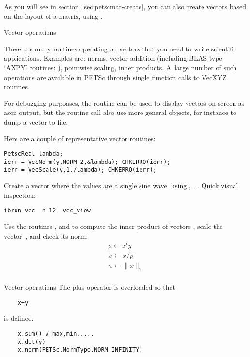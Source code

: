 As you will see in section~\ref{sec:petscmat-create},
you can also create vectors based on the layout of a matrix,
using .

 {Vector operations}

There are many routines operating on vectors that you need
to write scientific applications. Examples are: norms, vector addition
(including \ac{BLAS}-type `AXPY' routines: ),
pointwise scaling, inner products.
A~large number of such operations are available in PETSc through
single function calls to {VecXYZ} routines.

For debugging purpoases,
the  routine can be used to display vectors on screen as
ascii output,
%
%
but the routine call also use more general  objects, for
instance to dump a vector to file.

Here are a couple of representative vector routines:
\begin{lstlisting}
PetscReal lambda;
ierr = VecNorm(y,NORM_2,&lambda); CHKERRQ(ierr);
ierr = VecScale(y,1./lambda); CHKERRQ(ierr);  
\end{lstlisting}

\begin{exercise}
  Create a vector where the values are a single sine wave.
  using , ,
  .
  Quick visual inspection:
\begin{verbatim}
ibrun vec -n 12 -vec_view
\end{verbatim}
\end{exercise}

\begin{exercise}
Use the routines , 
and  to compute the inner product of vectors
, scale the vector~, and check its norm:
\[
\begin{array}{l}
p \leftarrow x^ty\\
x \leftarrow x/p\\
n \leftarrow \|x\|_2\\
\end{array}
\]
\end{exercise}

\begin{pythonnote}{Vector operations}
  The plus operator is overloaded so that
  \begin{lstlisting}
    x+y
  \end{lstlisting}
  is defined.
  \begin{lstlisting}
    x.sum() # max,min,....
    x.dot(y)
    x.norm(PETSc.NormType.NORM_INFINITY)
  \end{lstlisting}
\end{pythonnote}

